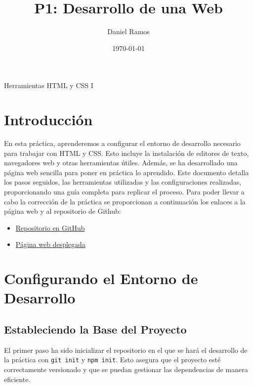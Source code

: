 \documentclass{article}
\title{P1: Desarrollo de una Web}
\author{Daniel Ramos}
\date{\today}
\begin{document}
\maketitle

\begin{center}
    \large Herramientas HTML y CSS I
\end{center}

\newpage

\tableofcontents

\newpage

\section*{Introducción}

En esta práctica, aprenderemos a configurar el entorno de desarrollo necesario para trabajar con HTML y CSS. Esto incluye la instalación de editores de texto, navegadores web y otras herramientas útiles. Además, se ha desarrollado una página web sencilla para poner en práctica lo aprendido. Este documento detalla los pasos seguidos, las herramientas utilizadas y las configuraciones realizadas, proporcionando una guía completa para replicar el proceso. Para poder llevar a cabo la corrección de la práctica se proporcionan a continuación los enlaces a la página web y al repositorio de Github:

\begin{itemize}
    \item \href{https://github.com/DanielRamosAcosta/hhyc-dramosac}{Repositorio en GitHub}
    \item \href{https://www.danielramos.me/hhyc-dramosac}{Página web desplegada}
\end{itemize}

\newpage

\section{Configurando el Entorno de Desarrollo}\label{sec:configurando-el-entorno-de-desarrollo}

\subsection{Estableciendo la Base del Proyecto}\label{subsec:estableciendo-la-base-del-proyecto}

El primer paso ha sido inicializar el repositorio en el que se hará el desarrollo de la práctica con \texttt{git init} y \texttt{npm init}. Esto asegura que el proyecto esté correctamente versionado y que se puedan gestionar las dependencias de manera eficiente.
\end{document}
